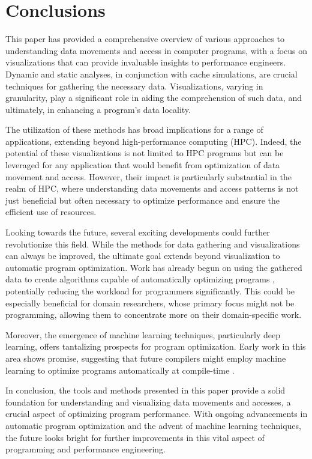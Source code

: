 \section{Conclusions}
This paper has provided a comprehensive overview of various approaches to understanding data movements and access in computer programs, with a focus on visualizations that can provide invaluable insights to performance engineers. Dynamic and static analyses, in conjunction with cache simulations, are crucial techniques for gathering the necessary data. Visualizations, varying in granularity, play a significant role in aiding the comprehension of such data, and ultimately, in enhancing a program's data locality.

The utilization of these methods has broad implications for a range of applications, extending beyond high-performance computing (HPC). Indeed, the potential of these visualizations is not limited to HPC programs but can be leveraged for any application that would benefit from optimization of data movement and access. However, their impact is particularly substantial in the realm of HPC, where understanding data movements and access patterns is not just beneficial but often necessary to optimize performance and ensure the efficient use of resources.

Looking towards the future, several exciting developments could further revolutionize this field. While the methods for data gathering and visualizations can always be improved, the ultimate goal extends beyond visualization to automatic program optimization. Work has already begun on using the gathered data to create algorithms capable of automatically optimizing programs \cite{calotoiu2022lifting}, potentially reducing the workload for programmers significantly. This could be especially beneficial for domain researchers, whose primary focus might not be programming, allowing them to concentrate more on their domain-specific work.

Moreover, the emergence of machine learning techniques, particularly deep learning, offers tantalizing prospects for program optimization. Early work in this area shows promise, suggesting that future compilers might employ machine learning to optimize programs automatically at compile-time \cite{cummins2021programl}.

In conclusion, the tools and methods presented in this paper provide a solid foundation for understanding and visualizing data movements and accesses, a crucial aspect of optimizing program performance. With ongoing advancements in automatic program optimization and the advent of machine learning techniques, the future looks bright for further improvements in this vital aspect of programming and performance engineering.